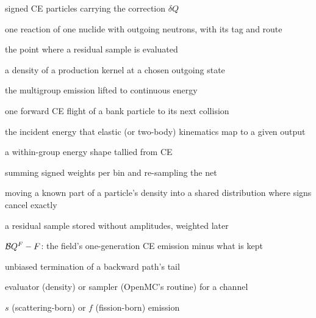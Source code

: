 \begin{description}[style=nextline,leftmargin=2.2cm,font=\normalfont\bfseries]
\item[bank] signed CE particles carrying the correction $\delta Q$
\item[channel] one reaction of one nuclide with outgoing neutrons, with its tag and route
\item[destination] the point where a residual sample is evaluated
\item[evaluator] a density of a production kernel at a chosen outgoing state
\item[field] the multigroup emission lifted to continuous energy
\item[flight] one forward CE flight of a bank particle to its next collision
\item[image] the incident energy that elastic (or two-body) kinematics map to a given output
\item[lift] a within-group energy shape tallied from CE
\item[netting] summing signed weights per bin and re-sampling the net
\item[pooling] moving a known part of a particle's density into a shared distribution where signs cancel exactly
\item[record] a residual sample stored without amplitudes, weighted later
\item[residual] $\mathcal B Q^F-F$: the field's one-generation CE emission minus what is kept
\item[roulette] unbiased termination of a backward path's tail
\item[route] evaluator (density) or sampler (OpenMC's routine) for a channel
\item[tag] $s$ (scattering-born) or $f$ (fission-born) emission
\end{description}
